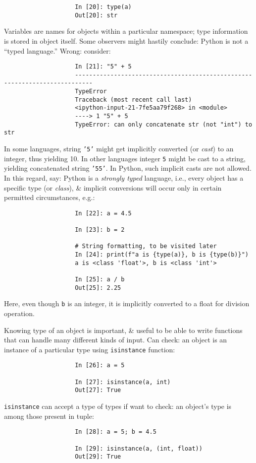 \documentclass{article}
\begin{document}
\begin{itemize}
\begin{itemize}
\begin{itemize}
\begin{itemize}
\begin{verbatim}
					In [20]: type(a)
					Out[20]: str
				\end{verbatim}
				Variables are names for objects within a particular namespace; type information is stored in object itself. Some observers might hastily conclude: Python is not a ``typed language.'' Wrong: consider:
				\begin{verbatim}
					In [21]: "5" + 5
					---------------------------------------------------------------------------
					TypeError
					Traceback (most recent call last)
					<ipython-input-21-7fe5aa79f268> in <module>
					----> 1 "5" + 5
					TypeError: can only concatenate str (not "int") to str
				\end{verbatim}
				In some languages, string {\tt'5'} might get implicitly converted (or {\it cast}) to an integer, thus yielding 10. In other languages integer {\tt5} might be cast to a string, yielding concatenated string {\tt'55'}. In Python, such implicit casts are not allowed. In this regard, say: Python is a {\it strongly typed} language, i.e., every object has a specific type (or {\it class}), \& implicit conversions will occur only in certain permitted circumstances, e.g.:
				\begin{verbatim}
					In [22]: a = 4.5
					
					In [23]: b = 2
					
					# String formatting, to be visited later
					In [24]: print(f"a is {type(a)}, b is {type(b)}")
					a is <class 'float'>, b is <class 'int'>
					
					In [25]: a / b
					Out[25]: 2.25
				\end{verbatim}
				Here, even though {\tt b} is an integer, it is implicitly converted to a float for division operation.
				
				Knowing type of an object is important, \& useful to be able to write functions that can handle many different kinds of input. Can check: an object is an instance of a particular type using {\tt isinstance} function:
				\begin{verbatim}
					In [26]: a = 5
					
					In [27]: isinstance(a, int)
					Out[27]: True
				\end{verbatim}
				{\tt isinstance} can accept a type of types if want to check: an object's type is among those present in tuple:
				\begin{verbatim}
					In [28]: a = 5; b = 4.5
					
					In [29]: isinstance(a, (int, float))
					Out[29]: True
					

\end{verbatim}
\end{itemize}
\end{itemize}
\end{itemize}
\end{itemize}
\end{document}
